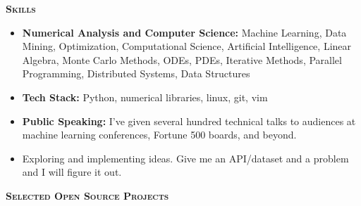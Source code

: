 \documentclass[letterpaper, 11pt]{article}
\renewcommand{\section}[1]{%
  \begin{tcolorbox}
    \textsc{\textbf{\large{#1}}}
  \end{tcolorbox}
}
\begin{document}

\section{Skills}


\begin{itemize}

\item {\bf Numerical Analysis and Computer Science:} Machine Learning, Data Mining, Optimization, Computational Science, Artificial Intelligence, Linear Algebra, Monte Carlo Methods, ODEs, PDEs, Iterative Methods, Parallel Programming, Distributed Systems, Data Structures

\item {\bf Tech Stack:} Python, numerical libraries, linux, git, vim

\item {\bf Public Speaking:} I've given several hundred technical talks to audiences at machine learning conferences, Fortune 500 boards, and beyond.

\item Exploring and implementing ideas. Give me an API/dataset and a problem and I will figure it out.

\end{itemize}


\section{Selected Open Source Projects}

\end{document}
